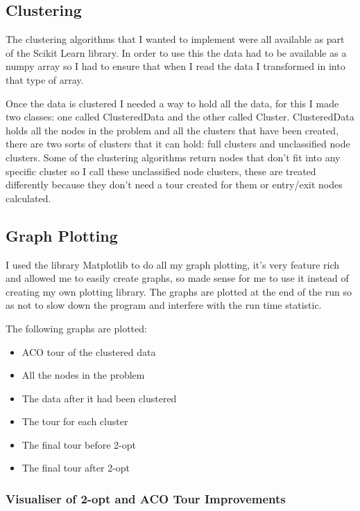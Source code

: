 \subsection{Clustering}

The clustering algorithms that I wanted to implement were all available as part of the Scikit Learn library. In order to use this the data had to be available as a numpy array so I had to ensure that when I read the data I transformed in into that type of array. 

Once the data is clustered I needed a way to hold all the data, for this I made two classes: one called ClusteredData and the other called Cluster. ClusteredData holds all the nodes in the problem and all the clusters that have been created, there are two sorts of clusters that it can hold: full clusters and unclassified node clusters. Some of the clustering algorithms return nodes that don't fit into any specific cluster so I call these unclassified node clusters, these are treated differently because they don't need a tour created for them or entry/exit nodes calculated. 

\subsection{Graph Plotting}

I used the library Matplotlib\cite{matplotlib} to do all my graph plotting, it's very feature rich and allowed me to easily create graphs, so made sense for me to use it instead of creating my own plotting library. The graphs are plotted at the end of the run so as not to slow down the program and interfere with the run time statistic.

The following graphs are plotted:

\begin{itemize}
    \item ACO tour of the clustered data
    \item All the nodes in the problem
    \item The data after it had been clustered
    \item The tour for each cluster
    \item The final tour before 2-opt
    \item The final tour after 2-opt
\end{itemize}

\subsubsection{Visualiser of 2-opt and ACO Tour Improvements}

